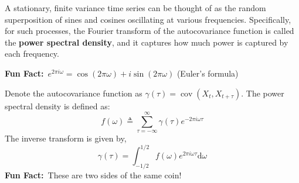 \documentclass[a4paper,11pt]{exam}
\newif\ifPSD %
\DeclareMathOperator*{\cov}{cov}
\newcommand{\funfact}{\textbf{Fun Fact:}~}
\begin{document}
\begin{questions}

\ifPSD
\newpage
\question
A stationary, finite variance time series can be thought of as the random superposition of sines and cosines oscillating at various frequencies.
Specifically, for such processes, the Fourier transform of the autocovariance function is called the \textbf{power spectral density}, and it captures how much power is captured by each frequency.
\begin{tcolorbox}
    \funfact $e^{2\pi i \omega} = \cos(2\pi\omega) + i \sin(2\pi\omega)$
    \qquad (Euler's formula)
\end{tcolorbox}
\begin{tcolorbox}
    Denote the autocovariance function as $\gamma(\tau) = \cov(X_t, X_{t+\tau})$.
    The power spectral density is defined as:
    \begin{equation}\label{eq:psd:acov}
	f(\omega) \triangleq \sum_{\tau=-\infty}^{\infty} \gamma(\tau) e^{-2\pi i \omega \tau}
    \end{equation}
    The inverse transform is given by,
    \begin{equation}\label{eq:psd:acov:inv}
	\gamma(\tau) = \int_{-1/2}^{1/2} f(\omega) e^{2\pi i \omega \tau} \mathrm{d}\omega
    \end{equation}
    \funfact These are two sides of the same coin!
\end{tcolorbox}
\end{questions}
\end{document}

